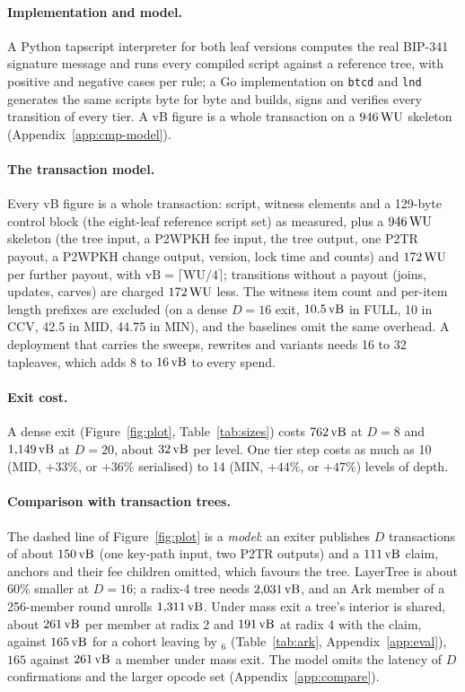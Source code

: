 \paragraph{Implementation and model.} A Python tapscript interpreter for
both leaf versions computes the real BIP-341 signature message and runs
every compiled script against a reference tree, with positive and
negative cases per rule; a Go implementation on
\texttt{btcd} and \texttt{lnd} generates the same scripts byte for byte
and builds, signs and verifies every transition of every tier. A vB figure is a
whole transaction on a $946\,\mathrm{WU}$ skeleton (Appendix~\ref{app:cmp-model}).
\fi

\iffullversion
\paragraph{The transaction model.} Every vB figure is a whole
transaction: script, witness elements and a 129-byte control block (the
eight-leaf reference script set) as measured, plus a $946\,\mathrm{WU}$ skeleton
(the tree input, a P2WPKH fee input, the tree output, one P2TR payout, a
P2WPKH change output, version, lock time and counts) and $172\,\mathrm{WU}$ per
further payout, with $\mathrm{vB} = \lceil \mathrm{WU}/4 \rceil$;
transitions without a payout (joins, updates, carves) are charged
$172\,\mathrm{WU}$ less. The witness item count and per-item length prefixes are
excluded (on a dense $D = 16$ exit, $10.5\,\mathrm{vB}$ in FULL, 10 in CCV, 42.5
in MID, 44.75 in MIN), and the baselines omit the same overhead. A deployment that carries the
sweeps, rewrites and variants needs 16 to 32 tapleaves, which adds 8 to
$16\,\mathrm{vB}$ to every spend.
\fi

\paragraph{Exit cost.} A dense exit (Figure~\ref{fig:plot},
Table~\ref{tab:sizes}) costs $762\,\mathrm{vB}$ at $D = 8$ and $1{,}149\,\mathrm{vB}$ at
$D = 20$, about $32\,\mathrm{vB}$ per level. One tier step costs as much as 10 (MID, $+33\%$, or $+36\%$
serialised) to 14 (MIN, $+44\%$, or $+47\%$) levels of depth.

\paragraph{Comparison with transaction trees.} The dashed line of
Figure~\ref{fig:plot} is a \emph{model}: an exiter publishes $D$
transactions of about $150\,\mathrm{vB}$\iffullversion{} (one key-path input, two P2TR outputs)\fi{} and
a $111\,\mathrm{vB}$ claim, anchors and their fee children omitted, which favours
the tree. LayerTree is about 60\% smaller at $D = 16$\iffullversion; a radix-4 tree
needs $2{,}031\,\mathrm{vB}$, and an Ark member of a 256-member round unrolls
$1{,}311\,\mathrm{vB}$. Under mass exit a tree's interior is shared, about $261\,\mathrm{vB}$
per member at radix 2 and $191\,\mathrm{vB}$ at radix 4 with the claim, against
$165\,\mathrm{vB}$ for a cohort leaving by $_6$ (Table~\ref{tab:ark},
Appendix~\ref{app:eval})\else, $165$ against $261\,\mathrm{vB}$ a member under
mass exit\fi. The model omits the latency of $D$
confirmations and the larger opcode set\iffullversion\else{}
(Appendix~\ref{app:compare})\fi.



